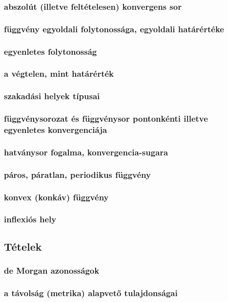 \documentclass[12pt]{article}
\begin{document}
\subsubsection{abszolút (illetve feltételesen) konvergens sor}
\subsubsection{függvény egyoldali folytonossága,
egyoldali határértéke}
\subsubsection{egyenletes folytonosság}
\subsubsection{a végtelen, mint határérték}
\subsubsection{szakadási helyek típusai}
\subsubsection{függvénysorozat és függvénysor pontonkénti illetve egyenletes konvergenciája}
\subsubsection{hatványsor fogalma, konvergencia-sugara}
\subsubsection{páros, páratlan, periodikus
függvény}
\subsubsection{konvex (konkáv) függvény}
\subsubsection{inflexiós hely}


\subsection{Tételek}

\subsubsection{de Morgan azonosságok}
\subsubsection{a távolság (metrika) alapvető tulajdonságai}
\end{document}
